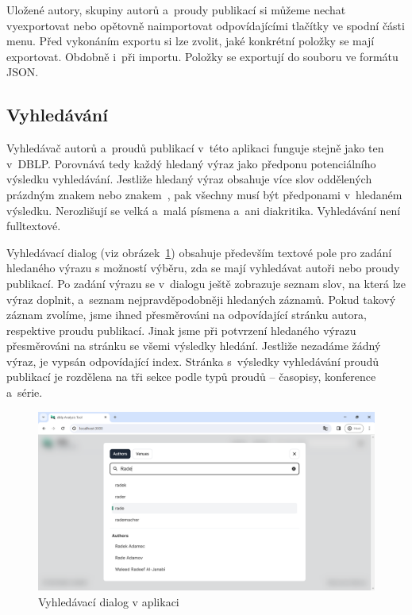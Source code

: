 \documentclass[
  biblatex,
  sourcecodes,
  glossaries,
  index
]{kidiplom}
\begin{document}
Uložené autory, skupiny autorů a~proudy publikací si můžeme nechat vyexportovat nebo opětovně naimportovat odpovídajícími tlačítky ve spodní části menu. Před vykonáním exportu si lze zvolit, jaké konkrétní položky se mají exportovat. Obdobně i~při importu. Položky se exportují do souboru ve formátu JSON.

\subsection{Vyhledávání}

Vyhledávač autorů a~proudů publikací v~této aplikaci funguje stejně jako ten v~DBLP. Porovnává tedy každý hledaný výraz jako předponu potenciálního výsledku vyhledávání. Jestliže hledaný výraz obsahuje více slov oddělených prázdným znakem nebo znakem~\uv{+}, pak všechny musí být předponami v~hledaném výsledku. Nerozlišují se velká a~malá písmena a~ani diakritika. Vyhledávání není fulltextové.

Vyhledávací dialog (viz obrázek~\ref{fig:vyhledavaci_dialog}) obsahuje především textové pole pro zadání hledaného výrazu s možností výběru, zda se mají vyhledávat autoři nebo proudy publikací. Po zadání výrazu se v~dialogu ještě zobrazuje seznam slov, na která lze výraz doplnit, a~seznam nejpravděpodobněji hledaných záznamů. Pokud takový záznam zvolíme, jsme ihned přesměrováni na odpovídající stránku autora, respektive proudu publikací. Jinak jsme při potvrzení hledaného výrazu přesměrováni na stránku se všemi výsledky hledání. Jestliže nezadáme žádný výraz, je vypsán odpovídající index. Stránka s~výsledky vyhledávání proudů publikací je rozdělena na tři sekce podle typů proudů -- časopisy, konference a~série.

\begin{figure}[H]
\begin{center}
\includegraphics[width=\textwidth]{vyhledavaci_dialog}
\caption{Vyhledávací dialog v aplikaci}\label{fig:vyhledavaci_dialog}
\end{center}
\end{figure}
\end{document}
